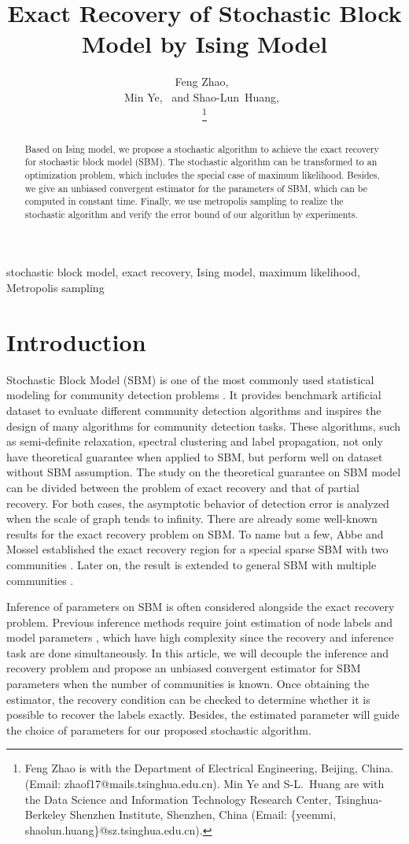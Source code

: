 \documentclass[journal]{IEEEtran}
\title{Exact Recovery of Stochastic Block Model by Ising Model}
\author{
	Feng Zhao,~\IEEEmembership{Student Member, IEEE}\\
	Min Ye,~\IEEEmembership{Member, IEEE} and
	Shao-Lun~Huang,~\IEEEmembership{Member, IEEE}\\
	\thanks{Feng Zhao is with the
		Department of Electrical Engineering, Beijing, China.
		(Email: zhaof17@mails.tsinghua.edu.cn).
		Min Ye and S-L.~Huang are with the Data Science and Information
		Technology Research Center, Tsinghua-Berkeley Shenzhen Institute,
		Shenzhen, China (Email: \{yeemmi, shaolun.huang\}@sz.tsinghua.edu.cn).
	}}
\newcommand{\1}{\mathbbm{1}}
\begin{document}
	\maketitle
\begin{abstract}
	Based on Ising model, we propose a stochastic algorithm to achieve the exact recovery for stochastic block model (SBM).
	The stochastic algorithm can be transformed to an optimization problem, which includes the special case of maximum likelihood.
	Besides, we give an unbiased convergent estimator for the parameters of SBM, which can be computed in constant time.
	Finally, we use metropolis sampling to realize the stochastic algorithm and verify the error bound of our algorithm by experiments.
\end{abstract}
\begin{IEEEkeywords}
	stochastic block model, exact recovery, Ising model, maximum likelihood, Metropolis sampling
\end{IEEEkeywords}
\section{Introduction}
Stochastic Block Model (SBM) is one of the most commonly used statistical modeling for community detection problems  \cite{holland1983stochastic, abbe2017community}.
It provides benchmark artificial dataset to evaluate different community detection algorithms
and inspires the design of many algorithms for community detection tasks. These algorithms, such as
semi-definite relaxation, spectral clustering and label propagation, not only have theoretical guarantee when applied to SBM,
but perform well on dataset without SBM assumption. The study on the theoretical guarantee on SBM model can be divided between
the problem of exact recovery and that of partial recovery. For both cases, the asymptotic behavior of detection error
is analyzed when the scale of graph tends to infinity. There are already some well-known results for the exact recovery problem
on SBM.	To name but a few, Abbe and Mossel established the exact recovery region for a special sparse SBM with two communities  \cite{abbe2015exact, mossel2016}.
Later on, the result is extended to general SBM with multiple communities \cite{abbe2015community}.

Inference of parameters on SBM is often considered alongside the exact recovery problem.
Previous inference methods require joint estimation of node labels and model parameters \cite{nowicki2001estimation}, which have high complexity since the recovery and inference task are done simultaneously.
In this article, we will decouple the inference and recovery problem and propose an unbiased convergent estimator for SBM parameters when the number of communities is known. Once obtaining the estimator, the recovery condition can be checked to determine whether it is possible to recover the labels
exactly. Besides, the estimated parameter will guide the choice of parameters for our proposed stochastic algorithm.
\end{document}
